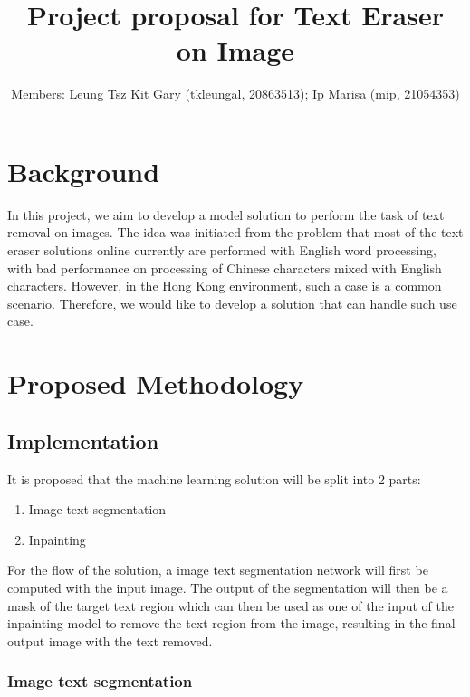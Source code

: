 \documentclass[10pt,twocolumn,letterpaper]{article}
\begin{document}
\title{Project proposal for Text Eraser on Image}

\author{
Members: Leung Tsz Kit Gary (tkleungal, 20863513);  %
Ip Marisa (mip, 21054353)
}
\maketitle

\section{Background}

In this project, we aim to develop a model solution to perform the task of text removal on images. 
The idea was initiated from the problem that most of the text eraser solutions online currently are performed with English word processing, 
with bad performance on processing of Chinese characters mixed with English characters. 
However, in the Hong Kong environment, such a case is a common scenario. Therefore, we would like to develop a solution that can handle such use case.

\section{Proposed Methodology}

\subsection{Implementation}

It is proposed that the machine learning solution will be split into 2 parts:
\begin{enumerate}
    \item Image text segmentation
    \item Inpainting
\end{enumerate}

For the flow of the solution, a image text segmentation network will first be computed with the input image.
The output of the segmentation will then be a mask of the target text region which can then be used as one of the input of the 
inpainting model to remove the text region from the image, resulting in the final output image with the text removed.

\subsubsection{Image text segmentation}
\end{document}

